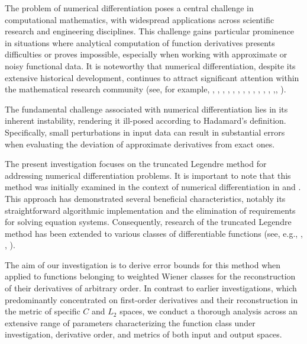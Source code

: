 \documentclass[10pt]{extarticle}
\begin{document}
The problem of numerical differentiation poses a central challenge in computational mathematics, 
with widespread applications across scientific research and engineering disciplines. 
This challenge gains particular prominence in situations where analytical computation of function derivatives 
presents difficulties or proves impossible, especially when working with approximate or noisy functional data. 
It is noteworthy that numerical differentiation, despite its extensive historical development, continues to attract 
significant attention within the mathematical research community (see, for example,
\cite{Dolgopolova&Ivanov_USSR_Comput_Math_Math_Phys_1966_Eng}, \cite{Ramm_1968_No11}, \cite{VasinVV_1969_V7_N2},
\cite{Cul71}, \cite{And84}, \cite{EgorKond_1989}, \cite{Groetsch_1992_V74_N2},  \cite{Qu96},
\cite{Hanke&Scherzer_2001_V108_N6}, \cite{RammSmir_2001}, \cite{Ahn&Choi&Ramm_2006},
\cite{ Wang_Hon_Ch_2006},  \cite{Nakamura&Wang&Wang_2008},\cite{Zhao&Meng&Zhao&You&Xie_2016}, \cite{SSS_CMAM}).

The fundamental challenge associated with numerical differentiation lies in its inherent instability, 
rendering it ill-posed according to Hadamard's definition.
Specifically, small perturbations in input data can result in substantial errors when evaluating the deviation 
of approximate derivatives from exact ones.

The present investigation focuses on the truncated Legendre method for addressing numerical differentiation problems.
It is important to note that this method was initially examined in the context of numerical differentiation
in \cite{Zhao_2010} and \cite{Lu&Naum&Per}.
This approach has demonstrated several beneficial characteristics, notably its straightforward algorithmic implementation 
and the elimination of requirements for solving equation systems.
Consequently, research of the truncated Legendre method has been extended to various classes of differentiable functions
(see, e.g., \cite{Sol_Stas_UMZ2022}, \cite{Sem_Sol_ETNA}, \cite{Sem_Sol_CMAM2024}).

The aim of our investigation is to derive error bounds for this method when applied to functions belonging 
to weighted Wiener classes for the reconstruction of their derivatives of arbitrary order.
In contrast to earlier investigations, which predominantly concentrated on first-order derivatives and 
their reconstruction in the metric of specific $C$ and $L_2$ spaces, we conduct a thorough analysis 
across an extensive range of parameters characterizing the function class under investigation, derivative order, 
and metrics of both input and output spaces.
\end{document}
